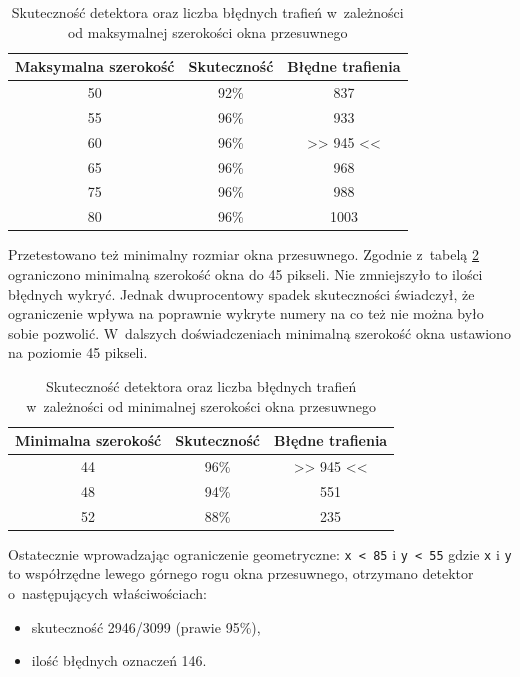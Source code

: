 \begin{table}[!h]
    \centering
    \begin{tabular}{c|c|c}
        Maksymalna szerokość & Skuteczność & Błędne trafienia
        \\ \hline
        50 & 92\% & 837 \\
        55 & 96\% & 933 \\
        60 & 96\% & >> 945 << \\
        65 & 96\% & 968 \\
        75 & 96\% & 988 \\
        80 & 96\% & 1003 \\
    \end{tabular}
    \caption{Skuteczność detektora oraz liczba błędnych trafień
    w~zależności od maksymalnej szerokości okna przesuwnego}
    \label{tab:final_number_detector_maxsize}
\end{table}

Przetestowano też minimalny rozmiar okna przesuwnego.
Zgodnie z~tabelą \ref{tab:final_number_detector_minsize} ograniczono 
minimalną szerokość okna do 45 pikseli. 
Nie zmniejszyło to ilości błędnych wykryć.
Jednak dwuprocentowy spadek skuteczności 
świadczył, że ograniczenie wpływa na poprawnie wykryte numery
na co też nie można było sobie pozwolić.
W~dalszych doświadczeniach minimalną szerokość
okna ustawiono na poziomie 45 pikseli.

\begin{table}[!h]
    \centering
    \begin{tabular}{c|c|c}
        Minimalna szerokość & Skuteczność & Błędne trafienia
        \\ \hline
        44 & 96\% & >> 945 << \\
        48 & 94\% & 551 \\
        52 & 88\% & 235 \\
    \end{tabular}
    \caption{Skuteczność detektora oraz liczba błędnych trafień
    w~zależności od minimalnej szerokości okna przesuwnego}
    \label{tab:final_number_detector_minsize}
\end{table}

Ostatecznie wprowadzając ograniczenie geometryczne:
\verb|x < 85| i \verb|y < 55| gdzie \verb|x| i \verb|y| to współrzędne
lewego górnego rogu okna przesuwnego, otrzymano detektor
o~następujących właściwościach:

\begin{itemize}
    \item skuteczność 2946/3099 (prawie 95\%),
    \item ilość błędnych oznaczeń 146.
\end{itemize}

